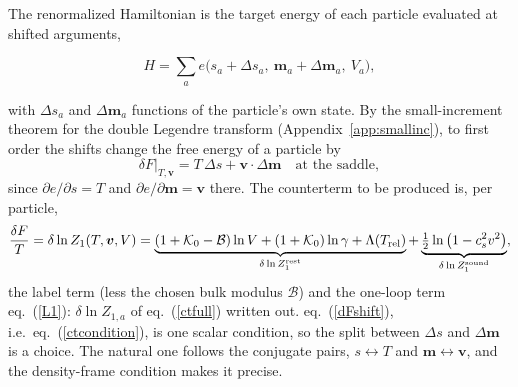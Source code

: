 \documentclass[11pt,aps,preprint,nofootinbib,superscriptaddress,tightenlines]{revtex4-2}
\newcommand{\klab}{\mathcal B}
\def\st{\begin{equation}}
\def\stp{\end{equation}}
\def\Eq#1{eq.~(\ref{#1})}
\def\App#1{Appendix~\ref{#1}}
\begin{document}
The renormalized Hamiltonian is the target energy of each particle evaluated at shifted arguments,
\begin{keyeq}
\st
H=\sum_ae\big(s_a+\Delta s_a,\ \bm m_a+\Delta\bm m_a,\ V_a\big) ,
\label{Hshift}
\stp
\end{keyeq}
with $\Delta s_a$ and $\Delta\bm m_a$ functions of the particle's own state.  By the small-increment theorem for the double Legendre transform (\App{app:smallinc}), to first order
the shifts change the free energy of a particle by
\st
\delta F\big|_{T,\bm v}=T\,\Delta s+\bm v\cdot\Delta\bm m\quad\text{at the saddle} ,
\label{dFshift}
\stp
since $\partial e/\partial s=T$ and $\partial e/\partial\bm m=\bm v$ there.  The counterterm to be produced is, per particle,
\st
\frac{\delta F}T=\delta\ln Z_1(T,\bm v,V)=\underbrace{(1+\mathcal K_0-\klab)\ln V+(1+\mathcal K_0)\ln\gamma+\Lambda(T_{\rm rel})}_{\delta\ln Z_1^{\rm rest}}
+\underbrace{\tfrac12\ln\big(1-c_s^2v^2\big)}_{\delta\ln Z_1^{\rm sound}} ,
\stp
the label term (less the chosen bulk modulus $\klab$) and the one-loop term \Eq{L1}: $\delta\ln Z_{1,a}$ of \Eq{ctfull} written out.  \Eq{dFshift}, i.e.\ \Eq{ctcondition}, is one scalar condition, so the split between $\Delta s$ and $\Delta\bm m$ is a choice.
The natural one follows the conjugate pairs, $s\leftrightarrow T$ and $\bm m\leftrightarrow\bm v$, and the density-frame condition makes it precise.
\end{document}
